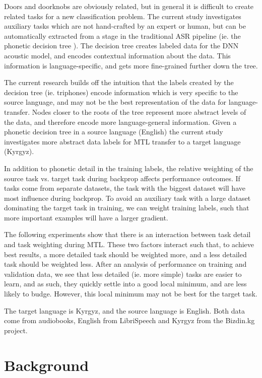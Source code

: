 \documentclass[a4paper]{article}
\begin{document}
Doors and doorknobs are obviously related, but in general it is difficult to create related tasks for a new classification problem. The current study investigates auxiliary tasks which are not hand-crafted by an expert or human, but can be automatically extracted from a stage in the traditional ASR pipeline (ie. the phonetic decision tree \cite{young1994tree}). The decision tree creates labeled data for the DNN acoustic model, and encodes contextual information about the data. This information is language-specific, and gets more fine-grained further down the tree.

The current research builds off the intuition that the labels created by the decision tree (ie. triphones) encode information which is very specific to the source language, and may not be the best representation of the data for language-transfer. Nodes closer to the roots of the tree represent more abstract levels of the data, and therefore encode more language-general information. Given a phonetic decision tree in a source language (English) the current study investigates more abstract data labels for MTL transfer to a target language (Kyrgyz).

In addition to phonetic detail in the training labels, the relative weighting of the source task vs. target task during backprop affects performance outcomes. If tasks come from separate datasets, the task with the biggest dataset will have most influence during backprop. To avoid an auxiliary task with a large dataset dominating the target task in training, we can weight training labels, such that more important examples will have a larger gradient.

The following experiments show that there is an interaction between task detail and task weighting during MTL. These two factors interact such that, to achieve best results, a more detailed task should be weighted more, and a less detailed task should be weighted less. After an analysis of performance on training and validation data, we see that less detailed (ie. more simple) tasks are easier to learn, and as such, they quickly settle into a good local minimum, and are less likely to budge. However, this local minimum may not be best for the target task.

The target language is Kyrgyz, and the source language is English. Both data come from audiobooks, English from LibriSpeech \cite{panayotov2015} and Kyrgyz from the Bizdin.kg project.




\section{Background}
\end{document}
